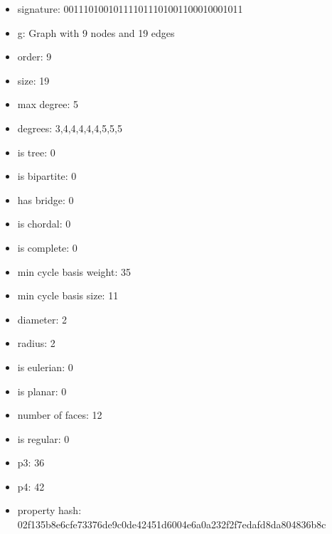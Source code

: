\newpage
\begin{figure}
\end{figure}
\begin{itemize}
\item signature: 001110100101111011101001100010001011
\item g: Graph with 9 nodes and 19 edges
\item order: 9
\item size: 19
\item max degree: 5
\item degrees: 3,4,4,4,4,4,5,5,5
\item is tree: 0
\item is bipartite: 0
\item has bridge: 0
\item is chordal: 0
\item is complete: 0
\item min cycle basis weight: 35
\item min cycle basis size: 11
\item diameter: 2
\item radius: 2
\item is eulerian: 0
\item is planar: 0
\item number of faces: 12
\item is regular: 0
\item p3: 36
\item p4: 42
\item property hash: 02f135b8e6cfe73376de9c0de42451d6004e6a0a232f2f7edafd8da804836b8c
\end{itemize}
